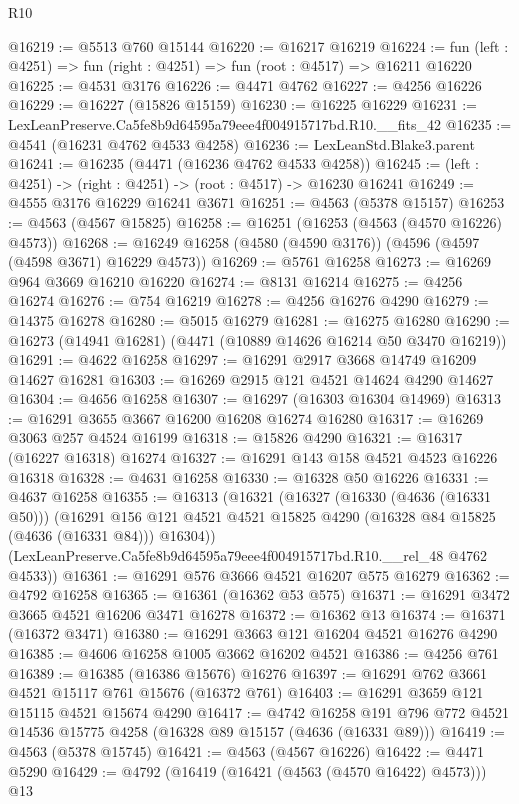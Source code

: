 \begin{lexlean}{R10}
\begin{coremodule}
@16219 := @5513 @760 @15144
@16220 := @16217 @16219
@16224 := fun (left : @4251) => fun (right : @4251) => fun (root : @4517) => @16211 @16220
@16225 := @4531 @3176
@16226 := @4471 @4762
@16227 := @4256 @16226
@16229 := @16227 (@15826 @15159)
@16230 := @16225 @16229
@16231 := LexLeanPreserve.Ca5fe8b9d64595a79eee4f004915717bd.R10.__fits_42
@16235 := @4541 (@16231 @4762 @4533 @4258)
@16236 := LexLeanStd.Blake3.parent
@16241 := @16235 (@4471 (@16236 @4762 @4533 @4258))
@16245 := (left : @4251) -> (right : @4251) -> (root : @4517) -> @16230 @16241
@16249 := @4555 @3176 @16229 @16241 @3671
@16251 := @4563 (@5378 @15157)
@16253 := @4563 (@4567 @15825)
@16258 := @16251 (@16253 (@4563 (@4570 @16226) @4573))
@16268 := @16249 @16258 (@4580 (@4590 @3176)) (@4596 (@4597 (@4598 @3671) @16229 @4573))
@16269 := @5761 @16258
@16273 := @16269 @964 @3669 @16210 @16220
@16274 := @8131 @16214
@16275 := @4256 @16274
@16276 := @754 @16219
@16278 := @4256 @16276 @4290
@16279 := @14375 @16278
@16280 := @5015 @16279
@16281 := @16275 @16280
@16290 := @16273 (@14941 @16281) (@4471 (@10889 @14626 @16214 @50 @3470 @16219))
@16291 := @4622 @16258
@16297 := @16291 @2917 @3668 @14749 @16209 @14627 @16281
@16303 := @16269 @2915 @121 @4521 @14624 @4290 @14627
@16304 := @4656 @16258
@16307 := @16297 (@16303 @16304 @14969)
@16313 := @16291 @3655 @3667 @16200 @16208 @16274 @16280
@16317 := @16269 @3063 @257 @4524 @16199
@16318 := @15826 @4290
@16321 := @16317 (@16227 @16318) @16274
@16327 := @16291 @143 @158 @4521 @4523 @16226 @16318
@16328 := @4631 @16258
@16330 := @16328 @50 @16226
@16331 := @4637 @16258
@16355 := @16313
    (@16321
      (@16327
        (@16330 (@4636 (@16331 @50)))
        (@16291 @156 @121 @4521 @4521 @15825 @4290 (@16328 @84 @15825 (@4636 (@16331 @84))) @16304))
      (LexLeanPreserve.Ca5fe8b9d64595a79eee4f004915717bd.R10.__rel_48 @4762 @4533))
@16361 := @16291 @576 @3666 @4521 @16207 @575 @16279
@16362 := @4792 @16258
@16365 := @16361 (@16362 @53 @575)
@16371 := @16291 @3472 @3665 @4521 @16206 @3471 @16278
@16372 := @16362 @13
@16374 := @16371 (@16372 @3471)
@16380 := @16291 @3663 @121 @16204 @4521 @16276 @4290
@16385 := @4606 @16258 @1005 @3662 @16202 @4521
@16386 := @4256 @761
@16389 := @16385 (@16386 @15676) @16276
@16397 := @16291 @762 @3661 @4521 @15117 @761 @15676 (@16372 @761)
@16403 := @16291 @3659 @121 @15115 @4521 @15674 @4290
@16417 := @4742
    @16258
    @191
    @796
    @772
    @4521
    @14536
    @15775
    @4258
    (@16328 @89 @15157 (@4636 (@16331 @89)))
@16419 := @4563 (@5378 @15745)
@16421 := @4563 (@4567 @16226)
@16422 := @4471 @5290
@16429 := @4792 (@16419 (@16421 (@4563 (@4570 @16422) @4573))) @13

\end{coremodule}
\end{lexlean}
